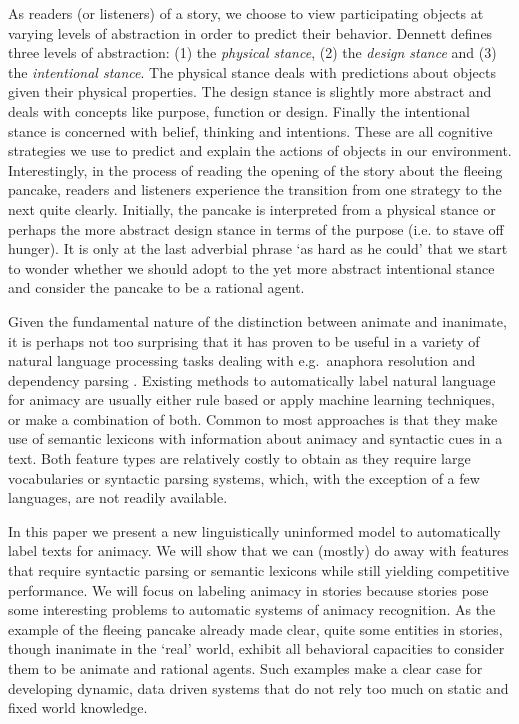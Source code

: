 \documentclass[a4paper,UKenglish]{oasics}
\begin{document}
As readers (or listeners) of a story, we choose to view participating
objects at varying levels of abstraction in order to predict their
behavior. Dennett \cite{dennett:96} defines three levels of
abstraction: (1) the \textit{physical stance}, (2) the \textit{design
  stance} and (3) the \textit{intentional stance}. The physical stance
deals with predictions about objects given their physical
properties. The design stance is slightly more abstract and deals with
concepts like purpose, function or design. Finally the intentional
stance is concerned with belief, thinking and intentions. These are
all cognitive strategies we use to predict and explain the actions of
objects in our environment. Interestingly, in the process of reading
the opening of the story about the fleeing pancake, readers and
listeners experience the transition from one strategy to the next
quite clearly. Initially, the pancake is interpreted from a physical
stance or perhaps the more abstract design stance in terms of the
purpose (i.e. to stave off hunger). It is only at the last adverbial
phrase `as hard as he could' that we start to wonder whether we should
adopt to the yet more abstract intentional stance and consider the
pancake to be a rational agent.

Given the fundamental nature of the distinction between animate and
inanimate, it is perhaps not too surprising that it has proven to be
useful in a variety of natural language processing tasks dealing with
e.g.\ anaphora resolution and dependency parsing
\cite{orasan:07,lee:13,ovr:niv:07}. Existing methods to automatically
label natural language for animacy are usually either rule based or
apply machine learning techniques, or make a combination of
both. Common to most approaches is that they make use of semantic
lexicons with information about animacy and syntactic cues in a
text. Both feature types are relatively costly to obtain as they
require large vocabularies or syntactic parsing systems, which, with
the exception of a few languages, are not readily available.

In this paper we present a new linguistically uninformed model to
automatically label texts for animacy. We will show that we can (mostly)
do away with features that require syntactic parsing or semantic
lexicons while still yielding competitive performance. We will focus
on labeling animacy in stories because stories pose some interesting
problems to automatic systems of animacy recognition. As the example
of the fleeing pancake already made clear, quite some entities in
stories, though inanimate in the `real' world, exhibit all behavioral
capacities to consider them to be animate and rational agents. Such
examples make a clear case for developing dynamic, data driven systems
that do not rely too much on static and fixed world knowledge.
\end{document}
